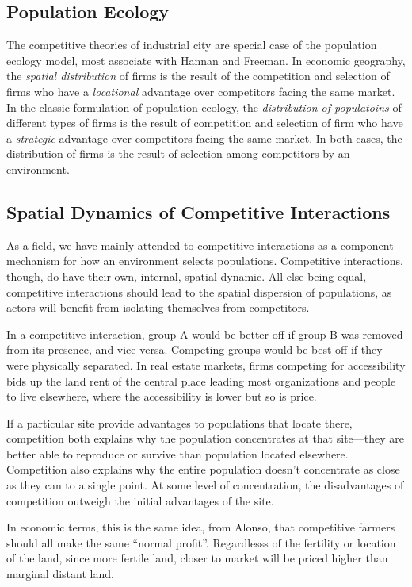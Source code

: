 \subsection*{Population Ecology}
The competitive theories of industrial city are special case of the
population ecology model, most associate with Hannan and Freeman.  In
economic geography, the \emph{spatial distribution} of firms is the
result of the competition and selection of firms who have a
\emph{locational} advantage over competitors facing the same
market. In the classic formulation of population ecology, the
\emph{distribution of populatoins} of different types of firms is the
result of competition and selection of firm who have a
\emph{strategic} advantage over competitors facing the same market. In
both cases, the distribution of firms is the result of selection
among competitors by an environment.\cite{hannan_population_1977}

\subsection*{Spatial Dynamics of Competitive Interactions}
As a field, we have mainly attended to competitive interactions as a
component mechanism for how an environment selects
populations. Competitive interactions, though, do have their own, internal,
spatial dynamic. All else being equal, competitive interactions should
lead to the spatial dispersion of populations, as actors will
benefit from isolating themselves from competitors.

In a competitive interaction, group A would be better off if group B
was removed from its presence, and vice versa. Competing groups would
be best off if they were physically separated.  In real estate
markets, firms competing for accessibility bids up the land rent of
the central place leading most organizations and people to live
elsewhere, where the accessibility is lower but so is price.

If a particular site provide advantages to populations that locate
there, competition both explains why the population concentrates at
that site---they are better able to reproduce or survive than
population located elsewhere. Competition also explains why the entire
population doesn't concentrate as close as they can to a single
point. At some level of concentration, the disadvantages of competition
outweigh the initial advantages of the site.

In economic terms, this is the same idea, from Alonso, that
competitive farmers should all make the same ``normal profit''.
Regardlesss of the fertility or location of the land, since more
fertile land, closer to market will be priced higher than marginal
distant land.\cite{alonso_theory_1960}

